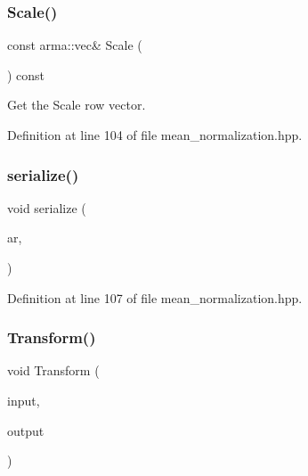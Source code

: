 \subsubsection{Scale()}
{\footnotesize\ttfamily const arma\+::vec\& Scale (\begin{DoxyParamCaption}{ }\end{DoxyParamCaption}) const\hspace{0.3cm}{\ttfamily [inline]}}



Get the Scale row vector. 



Definition at line 104 of file mean\+\_\+normalization.\+hpp.

\mbox{\label{classmlpack_1_1data_1_1MeanNormalization_a65cba07328997659bec80b9879b15a51}} 
\subsubsection{serialize()}
{\footnotesize\ttfamily void serialize (\begin{DoxyParamCaption}\item[{Archive \&}]{ar,  }\item[{const uint32\+\_\+t}]{ }\end{DoxyParamCaption})\hspace{0.3cm}{\ttfamily [inline]}}



Definition at line 107 of file mean\+\_\+normalization.\+hpp.

\mbox{\label{classmlpack_1_1data_1_1MeanNormalization_a7bc470a1e097f5b0aaf2396691432b3f}} 
\subsubsection{Transform()}
{\footnotesize\ttfamily void Transform (\begin{DoxyParamCaption}\item[{const Mat\+Type \&}]{input,  }\item[{Mat\+Type \&}]{output }\end{DoxyParamCaption})\hspace{0.3cm}{\ttfamily [inline]}}



